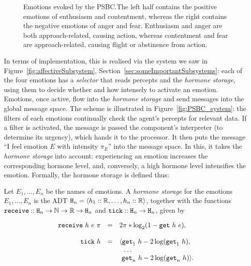 \begin{figure}[t]
	\centering
	
	\caption{Emotions evoked by the \textsc{PSBC}.The left half contains the positive emotions of enthusiasm and contentment, whereas the right contains the negative emotions of anger and fear. Enthusiasm and anger are both approach-related, causing action, whereas contentment and fear are approach-related, causing flight or abstinence from action.}
	\label{fig:PSBC}
\end{figure}

In terms of implementation, this is realised via the system we saw in Figure~\ref{fig:affectiveSubsystem}, Section~\ref{sec:someImportantSubsystems}: each of the four emotions has a \emph{selector} that reads percepts and the \emph{hormone storage}, using them to decide whether and how intensely to activate an emotion. Emotions, once active, flow into the \emph{hormone storage} and send messages into the global message space. The scheme is illustrated in Figure~\ref{fig:PSBC_system}: the filters of each emotions continually check the agent's percepts for relevant data. If a filter is activated, the message is passed the component's interpreter (to determine its urgency), which hands it to the processor. It then puts the message ``I feel emotion $E$ with intensity $\pi_E$'' into the message space. In this, it takes the \emph{hormone storage} into account: experiencing an emotion increases the corresponding hormone level, and, conversely, a high hormone level intensifies the emotion. Formally, the hormone storage is defined thus:

\begin{definition}
	Let $E_1,\dots,E_n$ be the names of emotions. A \emph{hormone storage} for the emotions $E_1,\dots,E_n$ is the ADT $\mathtt{H}_n = \langle h_1 :: \mathbb{R}, \dots, h_n :: \mathbb{R} \rangle$, together with the functions $\mathtt{receive} :: \mathtt{H}_n \rightarrow \mathbb{N} \rightarrow \mathbb{R} \rightarrow \mathtt{H}_n$ and $\mathtt{tick} :: \mathtt{H}_n \rightarrow \mathtt{H}_n$, given by
	
	$$
		\begin{array}{r c l}
			\mathtt{receive}\ h\ e\ \pi & = & 2\pi * \log_2(1-\mathtt{get}\ h\ e),\\
			\\
			\mathtt{tick}\ h & = & \langle \mathtt{get}_1\ h - 2\log(\mathtt{get}_1\ h),\\
							 &   & \ \ \dots\\
							 &   & \ \mathtt{get}_n\ h - 2\log(\mathtt{get}_n\ h) \rangle.
		\end{array}
	$$
\end{definition}

